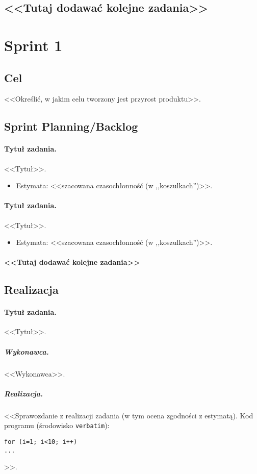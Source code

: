 \documentclass[a4paper]{article}
\begin{document}
\subsection*{<<Tutaj dodawać kolejne zadania>>}

\section{Sprint 1}
\subsection{Cel} <<Określić, w jakim celu tworzony jest przyrost produktu>>.
\subsection{Sprint Planning/Backlog}

\paragraph{Tytuł zadania.} <<Tytuł>>.
\begin{itemize}
\item Estymata: <<szacowana czasochłonność (w ,,koszulkach'')>>.
\end{itemize}

\paragraph{Tytuł zadania.} <<Tytuł>>.
\begin{itemize}
\item Estymata: <<szacowana czasochłonność (w ,,koszulkach'')>>.
\end{itemize}

\paragraph{<<Tutaj dodawać kolejne zadania>>}

\subsection{Realizacja}

\paragraph{Tytuł zadania.} <<Tytuł>>.
\subparagraph{Wykonawca.} <<Wykonawca>>.
\subparagraph{Realizacja.} <<Sprawozdanie z realizacji zadania (w tym ocena zgodności z estymatą). Kod programu (środowisko \texttt{verbatim}): \begin{verbatim}
for (i=1; i<10; i++)
...
\end{verbatim}>>.
\end{document}
